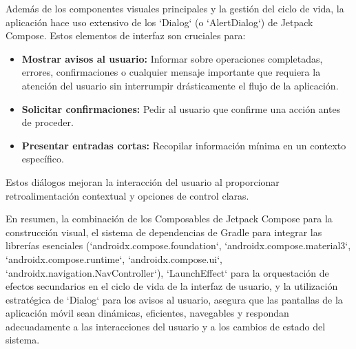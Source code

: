 Además de los componentes visuales principales y la gestión del ciclo de vida, la aplicación hace uso extensivo de los `Dialog` (o `AlertDialog`) de Jetpack Compose. Estos elementos de interfaz son cruciales para:
\begin{itemize}
	\item \textbf{Mostrar avisos al usuario:} Informar sobre operaciones completadas, errores, confirmaciones o cualquier mensaje importante que requiera la atención del usuario sin interrumpir drásticamente el flujo de la aplicación.
	\item \textbf{Solicitar confirmaciones:} Pedir al usuario que confirme una acción antes de proceder.
	\item \textbf{Presentar entradas cortas:} Recopilar información mínima en un contexto específico.
\end{itemize}
Estos diálogos mejoran la interacción del usuario al proporcionar retroalimentación contextual y opciones de control claras.

En resumen, la combinación de los Composables de Jetpack Compose para la construcción visual, el sistema de dependencias de Gradle para integrar las librerías esenciales (`androidx.compose.foundation`, `androidx.compose.material3`, `androidx.compose.runtime`, `androidx.compose.ui`, \\ `androidx.navigation.NavController`), `LaunchEffect` para la orquestación de efectos secundarios en el ciclo de vida de la interfaz de usuario, y la utilización estratégica de `Dialog` para los avisos al usuario, asegura que las pantallas de la aplicación móvil sean dinámicas, eficientes, navegables y respondan adecuadamente a las interacciones del usuario y a los cambios de estado del sistema.

%
%
